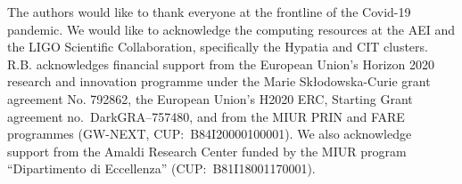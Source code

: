 The authors would like to thank everyone at the frontline of the Covid-19 pandemic. We would like to acknowledge the computing resources at the AEI and the LIGO Scientific Collaboration, specifically the Hypatia and CIT clusters. R.B. acknowledges financial support from the European Union's Horizon 2020 research and innovation programme under the Marie Sk\l odowska-Curie grant agreement No. 792862, the European Union's H2020 ERC, Starting Grant agreement no.~DarkGRA--757480, and from the MIUR PRIN and FARE programmes (GW-NEXT, CUP:~B84I20000100001). We also acknowledge support from the Amaldi Research Center funded by the MIUR program ``Dipartimento di Eccellenza'' (CUP:~B81I18001170001).